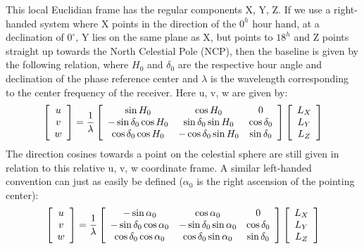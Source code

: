This local Euclidian frame has the regular components X, Y, Z. If we use a right-handed system where X points in the direction 
of the $0^h$ hour hand, at a declination of $0^{\circ}$, Y lies on the same plane as X, but points to $18^h$ and Z points straight up 
towards the North Celestial Pole (NCP), then the baseline is given by the following relation, where $H_0$ and $\delta_0$ are the 
respective hour angle and declination of the phase reference center and $\lambda$ is the wavelength corresponding to the center 
frequency of the receiver. Here u, v, w are given by:
\begin{equation}
 \label{EQN_RIGHTHANDED_SYSTEM}
 \left[\begin{array}{c}
     u\\
     v \\
     w \\
    \end{array}\right] = \frac{1}{\lambda}
 \left[\begin{array}{c c c}
     \sin{H_0} 			& \cos{H_0}			& 0 \\
     -\sin{\delta_0}\cos{H_0} 	& \sin{\delta_0}\sin{H_0}	& \cos{\delta_0}\\
     \cos{\delta_0}\cos{H_0} 	& -\cos{\delta_0}\sin{H_0}	& \sin{\delta_0}\\
    \end{array}\right]   
 \left[\begin{array}{c}
     L_X \\
     L_Y \\
     L_Z \\
    \end{array}\right]
\end{equation}
The direction cosines towards a point on the celestial sphere are still given in relation to this relative u, v, w coordinate frame.
A similar left-handed convention can just as easily be defined ($\alpha_0$ is the right ascension of the pointing center):
\begin{equation}
 \left[\begin{array}{c}
     u\\
     v \\
     w \\
    \end{array}\right] = \frac{1}{\lambda}
 \left[\begin{array}{c c c}
     -\sin{\alpha_0} 			& \cos{\alpha_0}		& 0 \\
     -\sin{\delta_0}\cos{\alpha_0} 	& -\sin{\delta_0}\sin{\alpha_0}	& \cos{\delta_0}\\
     \cos{\delta_0}\cos{\alpha_0} 	& \cos{\delta_0}\sin{\alpha_0}	& \sin{\delta_0}\\
    \end{array}\right]   
 \left[\begin{array}{c}
     L_X \\
     L_Y \\
     L_Z \\
    \end{array}\right]
\end{equation}

